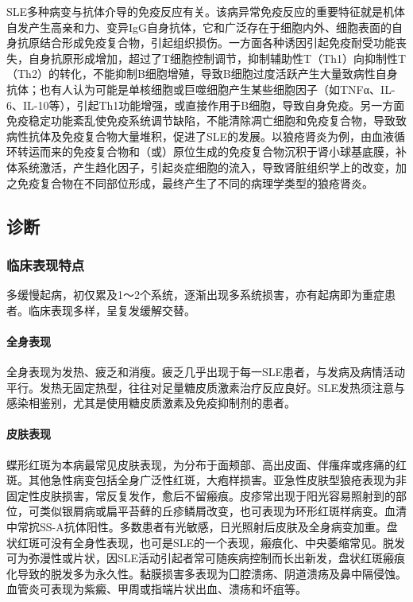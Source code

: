 SLE多种病变与抗体介导的免疫反应有关。该病异常免疫反应的重要特征就是机体自发产生高亲和力、变异IgG自身抗体，它和广泛存在于细胞内外、细胞表面的自身抗原结合形成免疫复合物，引起组织损伤。一方面各种诱因引起免疫耐受功能丧失，自身抗原形成增加，超过了T细胞控制调节，抑制辅助性T（Th1）向抑制性T（Th2）的转化，不能抑制B细胞增殖，导致B细胞过度活跃产生大量致病性自身抗体；也有人认为可能是单核细胞或巨噬细胞产生某些细胞因子（如TNFα、IL-6、IL-10等），引起Th1功能增强，或直接作用于B细胞，导致自身免疫。另一方面免疫稳定功能紊乱使免疫系统调节缺陷，不能清除凋亡细胞和免疫复合物，导致致病性抗体及免疫复合物大量堆积，促进了SLE的发展。以狼疮肾炎为例，由血液循环转运而来的免疫复合物和（或）原位生成的免疫复合物沉积于肾小球基底膜，补体系统激活，产生趋化因子，引起炎症细胞的流入，导致肾脏组织学上的改变，加之免疫复合物在不同部位形成，最终产生了不同的病理学类型的狼疮肾炎。

\subsection{诊断}

\subsubsection{临床表现特点}

多缓慢起病，初仅累及1～2个系统，逐渐出现多系统损害，亦有起病即为重症患者。临床表现多样，呈复发缓解交替。

\paragraph{全身表现}

全身表现为发热、疲乏和消瘦。疲乏几乎出现于每一SLE患者，与发病及病情活动平行。发热无固定热型，往往对足量糖皮质激素治疗反应良好。SLE发热须注意与感染相鉴别，尤其是使用糖皮质激素及免疫抑制剂的患者。

\paragraph{皮肤表现}

蝶形红斑为本病最常见皮肤表现，为分布于面颊部、高出皮面、伴瘙痒或疼痛的红斑。其他急性病变包括全身广泛性红斑，大疱样损害。亚急性皮肤型狼疮表现为非固定性皮肤损害，常反复发作，愈后不留瘢痕。皮疹常出现于阳光容易照射到的部位，可类似银屑病或扁平苔藓的丘疹鳞屑改变，也可表现为环形红斑样病变。血清中常抭SS-A抗体阳性。多数患者有光敏感，日光照射后皮肤及全身病变加重。盘状红斑可没有全身性表现，也可是SLE的一个表现，瘢痕化、中央萎缩常见。脱发可为弥漫性或片状，因SLE活动引起者常可随疾病控制而长出新发，盘状红斑瘢痕化导致的脱发多为永久性。黏膜损害多表现为囗腔溃疡、阴道溃疡及鼻中隔侵蚀。血管炎可表现为紫癜、甲周或指端片状出血、溃疡和坏疽等。

